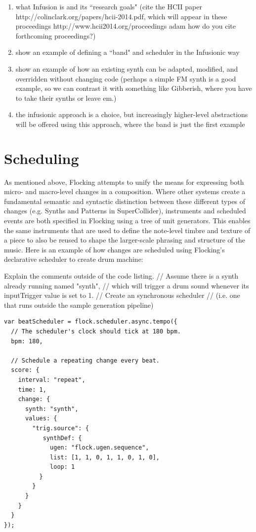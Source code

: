 \documentclass{article}
\begin{document}
\begin{enumerate}
\item what Infusion is and its ``research goals" (cite the HCII paper http://colinclark.org/papers/hcii-2014.pdf, which will appear in these proceedings http://www.hcii2014.org/proceedings adam how do you cite forthcoming proceedings?)
\item show an example of defining a ``band" and scheduler in the Infusionic way
\item show an example of how an existing synth can be adapted, modified, and overridden without changing code (perhaps a simple FM synth is a good example, so we can contrast it with something like Gibberish, where you have to take their synths or leave em.)
\item the infusionic approach is a choice, but increasingly higher-level abstractions will be offered using this approach, where the band is just the first example
\end{enumerate}

\section{Scheduling} \label{sec:Scheduling}

As mentioned above, Flocking attempts to unify the means for expressing both micro- and macro-level changes in a composition. Where other systems create a fundamental semantic and syntactic distinction between these different types of changes (e.g. Synths and Patterns in SuperCollider), instruments and scheduled events are both specified in Flocking using a tree of unit generators. This enables the same instruments that are used to define the note-level timbre and texture of a piece to also be reused to shape the larger-scale phrasing and structure of the music. Here is an example of how changes are scheduled using Flocking's declarative scheduler to create drum machine:


Explain the comments outside of the code listing. 
// Assume there is a synth already running named "synth",
// which will trigger a drum sound whenever its inputTrigger value is set to 1.
// Create an synchronous scheduler
// (i.e. one that runs outside the sample generation pipeline)


\begin{verbatim}
var beatScheduler = flock.scheduler.async.tempo({
  // The scheduler's clock should tick at 180 bpm.
  bpm: 180,

  // Schedule a repeating change every beat.
  score: {
    interval: "repeat",
    time: 1,
    change: {
      synth: "synth",
      values: {
        "trig.source": {
           synthDef: {
             ugen: "flock.ugen.sequence",
             list: [1, 1, 0, 1, 1, 0, 1, 0],
             loop: 1
          }
        }
      }
    }
  }
});

\end{verbatim}
\end{document}
